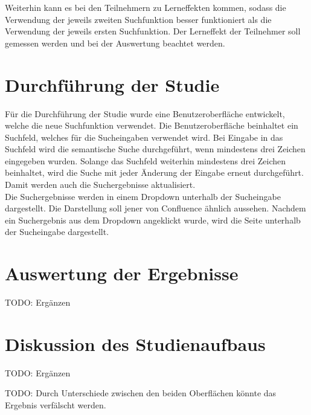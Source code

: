 Weiterhin kann es bei den Teilnehmern zu Lerneffekten kommen, sodass die Verwendung der jeweils zweiten Suchfunktion besser funktioniert als die Verwendung der jeweils ersten Suchfunktion.
Der Lerneffekt der Teilnehmer soll gemessen werden und bei der Auswertung beachtet werden.

\section{Durchführung der Studie}
Für die Durchführung der Studie wurde eine Benutzeroberfläche entwickelt, welche die neue Suchfunktion verwendet.
Die Benutzeroberfläche beinhaltet ein Suchfeld, welches für die Sucheingaben verwendet wird.
Bei Eingabe in das Suchfeld wird die semantische Suche durchgeführt, wenn mindestens drei Zeichen eingegeben wurden.
Solange das Suchfeld weiterhin mindestens drei Zeichen beinhaltet, wird die Suche mit jeder Änderung der Eingabe erneut durchgeführt.
Damit werden auch die Suchergebnisse aktualisiert.\\

Die Suchergebnisse werden in einem Dropdown unterhalb der Sucheingabe dargestellt.
Die Darstellung soll jener von Confluence ähnlich aussehen.
Nachdem ein Suchergebnis aus dem Dropdown angeklickt wurde, wird die Seite unterhalb der Sucheingabe dargestellt.


\section{Auswertung der Ergebnisse}
TODO: Ergänzen


\section{Diskussion des Studienaufbaus}
TODO: Ergänzen

TODO: Durch Unterschiede zwischen den beiden Oberflächen könnte das Ergebnis verfälscht werden. 
